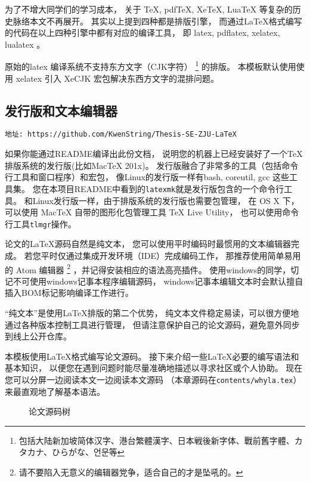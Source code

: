 为了不增大同学们的学习成本，
关于 TeX, pdfTeX,  XeTeX,  LuaTeX 等复杂的历史脉络本文不再展开。
其实以上提到四种都是排版引擎，
而通过\LaTeX 格式编写的代码在以上四种引擎中都有对应的编译工具，
即 latex, pdflatex, xelatex, lualatex 。

原始的latex 编译系统不支持东方文字（CJK字符）
\footnote{包括大陆新加坡简体汉字、港台繁體漢字、日本戦後新字体、戰前舊字體、カタカナ、ひらがな、언문等}
的排版。
本模板默认使用使用 xelatex 引入 XeCJK 宏包解决东西方文字的混排问题。

\subsection{发行版和文本编辑器}
\begin{verbatim}
地址: https://github.com/KwenString/Thesis-SE-ZJU-LaTeX
\end{verbatim}
如果你能通过README编译出此份文档，
说明您的机器上已经安装好了一个\TeX 排版系统的发行版(比如MacTeX 201x)。
发行版融合了非常多的工具（包括命令行工具和窗口程序）和宏包，
像Linux的发行版一样有bash, coreutil, gcc 这些工具集。
您在本项目README中看到的\texttt{latexmk}就是发行版包含的一个命令行工具。
和Linux发行版一样，由于排版系统的发行版也需要包管理，
在 OS X 下，可以使用 MacTeX 自带的图形化包管理工具 TeX Live Utility，
也可以使用命令行工具\texttt{tlmgr}操作。

论文的\LaTeX 源码自然是纯文本，
您可以使用平时编码时最惯用的文本编辑器完成。
若您平时仅通过集成开发环境（IDE）完成编码工作，
那推荐使用简单易用的 Atom 编辑器
\footnote{请不要陷入无意义的编辑器党争，适合自己的才是坠吼的。} %
，并记得安装相应的语法高亮插件。
使用windows的同学，切记不可使用windows记事本程序编辑源码，
windows记事本编辑文本时会默认擅自插入BOM标记影响编译工作进行。

“纯文本”是使用\LaTeX 排版的第二个优势，
纯文本文件稳定易读，可以很方便地通过各种版本控制工具进行管理，
但请注意保护自己的论文源码，避免意外同步到线上公开仓库。

本模板使用\LaTeX 格式编写论文源码。
\label{dirtree}
接下来介绍一些\LaTeX 必要的编写语法和基本知识，
以便您在遇到问题时能尽量准确地描述以寻求社区或个人协助。
现在您可以分屏一边阅读本文一边阅读本文源码
（本章源码在\texttt{contents/whyla.tex}）
来最直观地了解基本语法。

\begin{figure}[htbp]
    \centering
    \caption{论文源码树}
\end{figure}

